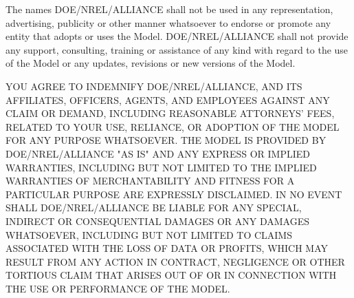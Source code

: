 \documentclass{scrartcl} %
\begin{document}
The names DOE/NREL/ALLIANCE shall not be used in any representation, advertising, publicity or other manner whatsoever to endorse or promote any entity that adopts or uses the Model.  DOE/NREL/ALLIANCE shall not provide any support, consulting, training or assistance of any kind with regard to the use of the Model or any updates, revisions or new versions of the Model.

YOU AGREE TO INDEMNIFY DOE/NREL/ALLIANCE, AND ITS AFFILIATES, OFFICERS, AGENTS, AND EMPLOYEES AGAINST ANY CLAIM OR DEMAND, INCLUDING REASONABLE ATTORNEYS' FEES, RELATED TO YOUR USE, RELIANCE, OR ADOPTION OF THE MODEL FOR ANY PURPOSE WHATSOEVER.  THE MODEL IS PROVIDED BY DOE/NREL/ALLIANCE "AS IS" AND ANY EXPRESS OR IMPLIED WARRANTIES, INCLUDING BUT NOT LIMITED TO THE IMPLIED WARRANTIES OF MERCHANTABILITY AND FITNESS FOR A PARTICULAR PURPOSE ARE EXPRESSLY DISCLAIMED.  IN NO EVENT SHALL DOE/NREL/ALLIANCE BE LIABLE FOR ANY SPECIAL, INDIRECT OR CONSEQUENTIAL DAMAGES OR ANY DAMAGES WHATSOEVER, INCLUDING BUT NOT LIMITED TO CLAIMS ASSOCIATED WITH THE LOSS OF DATA OR PROFITS, WHICH MAY RESULT FROM ANY ACTION IN CONTRACT, NEGLIGENCE OR OTHER TORTIOUS CLAIM THAT ARISES OUT OF OR IN CONNECTION WITH THE USE OR PERFORMANCE OF THE MODEL.
\end{document}
